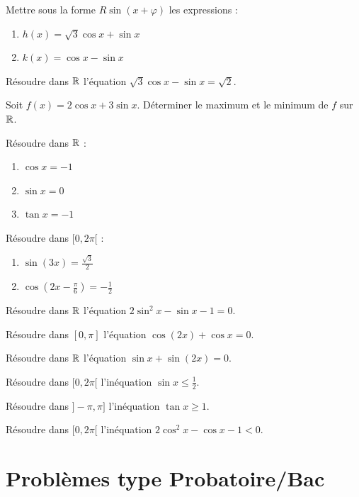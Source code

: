 
\exo{}
Mettre sous la forme $R\sin(x+\varphi)$ les expressions :
\begin{enumerate}[label=\alph*)]
    \item $h(x) = \sqrt3\cos x + \sin x$
    \item $k(x) = \cos x - \sin x$
\end{enumerate}

\exo{}
Résoudre dans $\mathbb{R}$ l'équation $\sqrt3\cos x - \sin x = \sqrt2$.

\exo{}
Soit $f(x) = 2\cos x + 3\sin x$. Déterminer le maximum et le minimum de $f$ sur $\mathbb{R}$.


\exo{}
Résoudre dans $\mathbb{R}$ :
\begin{enumerate}[label=\alph*)]
    \item $\cos x = -1$
    \item $\sin x = 0$
    \item $\tan x = -1$
\end{enumerate}

\exo{}
Résoudre dans $[0,2\pi[$ :
\begin{enumerate}[label=\alph*)]
    \item $\sin(3x) = \frac{\sqrt3}{2}$
    \item $\cos\left(2x-\frac{\pi}{6}\right) = -\frac12$
\end{enumerate}

\exo{}
Résoudre dans $\mathbb{R}$ l'équation $2\sin^2 x - \sin x - 1 = 0$.

\exo{}
Résoudre dans $[0,\pi]$ l'équation $\cos(2x) + \cos x = 0$.

\exo{}
Résoudre dans $\mathbb{R}$ l'équation $\sin x + \sin(2x) = 0$.


\exo{}
Résoudre dans $[0,2\pi[$ l'inéquation $\sin x \le \frac12$.

\exo{}
Résoudre dans $]-\pi,\pi]$ l'inéquation $\tan x \ge 1$.

\exo{}
Résoudre dans $[0,2\pi[$ l'inéquation $2\cos^2 x - \cos x - 1 < 0$.

\section{Problèmes type Probatoire/Bac}

